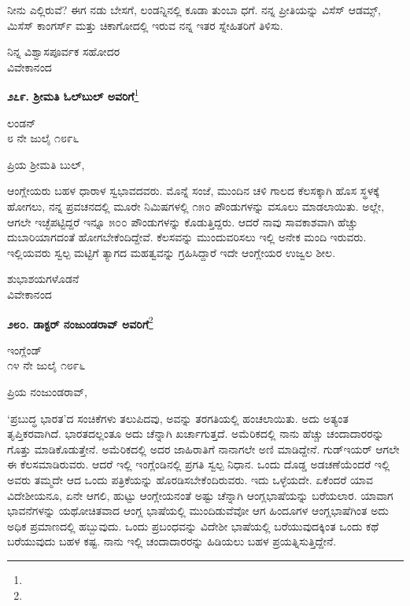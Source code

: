 ನೀನು ಎಲ್ಲಿರುವೆ? ಈಗ ನಡು ಬೇಸಗೆ, ಲಂಡನ್ನಿನಲ್ಲಿ ಕೂಡಾ ತುಂಬಾ ಧಗೆ. ನನ್ನ ಪ್ರೀತಿಯನ್ನು ವಿಸೆಸ್ ಆಡಮ್ಸ್, ಮಿಸೆಸ್ ಕಾಂಗರ್ಸ್ ಮತ್ತು ಚಿಕಾಗೋದಲ್ಲಿ ಇರುವ ನನ್ನ ಇತರ ಸ್ನೇಹಿತರಿಗೆ ತಿಳಿಸು.

\vspace{-0.5cm}

{\flushright
ನಿನ್ನ ವಿಶ್ವಾಸಪೂರ್ವಕ ಸಹೋದರ\\ವಿವೇಕಾನಂದ\par}

\begin{center}
\textbf{೨೭೯. ಶ‍್ರೀಮತಿ ಓಲ್‌ಬುಲ್‌ ಅವರಿಗೆ}\footnote{}
\end{center}

\vspace{-0.5cm}

\begin{flushright}
ಲಂಡನ್\\೮ ನೇ ಜುಲೈ ೧೮೯೬
\end{flushright}

\vspace{-0.5cm}

\noindent
ಪ್ರಿಯ ಶ‍್ರೀಮತಿ ಬುಲ್,

ಆಂಗ್ಲೇಯರು ಬಹಳ ಧಾರಾಳ ಸ್ವಭಾವದವರು. ಮೊನ್ನೆ ಸಂಜೆ, ಮುಂದಿನ ಚಳಿ ಗಾಲದ ಕೆಲಸಕ್ಕಾಗಿ ಹೊಸ ಸ್ಥಳಕ್ಕೆ ಹೋಗಲು, ನನ್ನ ಪ್ರವಚನದಲ್ಲಿ ಮೂರೇ ನಿಮಿಷಗಳಲ್ಲಿ ೧೫೦ ಪೌಂಡುಗಳನ್ನು ವಸೂಲು ಮಾಡಲಾಯಿತು. ಅಲ್ಲೇ, ಆಗಲೇ ಇಚ್ಛೆಪಟ್ಟಿದ್ದರೆ ಇನ್ನೂ ೫೦೦ ಪೌಂಡುಗಳನ್ನು ಕೊಡುತ್ತಿದ್ದರು. ಆದರೆ ನಾವು ಸಾವಕಾಶವಾಗಿ ಹೆಚ್ಚು ದುಬಾರಿಯಾಗದಂತೆ ಹೋಗಬೇಕೆಂದಿದ್ದೇವೆ. ಕೆಲಸವನ್ನು ಮುಂದುವರಿಸಲು ಇಲ್ಲಿ ಅನೇಕ ಮಂದಿ ಇರುವರು. ಇಲ್ಲಿಯವರು ಸ್ವಲ್ಪ ಮಟ್ಟಿಗೆ ತ್ಯಾಗದ ಮಹತ್ವವನ್ನು ಗ್ರಹಿಸಿದ್ದಾರೆ \enginline{-} ಇದೇ ಆಂಗ್ಲೇಯರ ಉಜ್ವಲ ಶೀಲ.

\vspace{-0.5cm}

{\flushright
ಶುಭಾಶಯಗಳೊಡನೆ\\ವಿವೇಕಾನಂದ\par}

\begin{center}
\textbf{೨೮೦. ಡಾಕ್ಟರ್ ನಂಜುಂಡರಾವ್ ಅವರಿಗೆ}\footnote{}
\end{center}

\begin{flushright}
ಇಂಗ್ಲೆಂಡ್\\೧೪ ನೇ ಜುಲೈ ೧೮೯೬
\end{flushright}

\noindent
ಪ್ರಿಯ ನಂಜುಂಡರಾವ್,

\vspace{0.1cm}

`ಪ್ರಬುದ್ಧ ಭಾರತ'ದ ಸಂಚಿಕೆಗಳು ತಲುಪಿದವು, ಅವನ್ನು ತರಗತಿಯಲ್ಲಿ ಹಂಚಲಾಯಿತು. ಅದು ಅತ್ಯಂತ ತೃಪ್ತಿಕರವಾಗಿದೆ. ಭಾರತದಲ್ಲಂತೂ ಅದು ಚೆನ್ನಾಗಿ ಖರ್ಚಾಗು\break ತ್ತದೆ. ಅಮೆರಿಕದಲ್ಲಿ ನಾನು ಹೆಚ್ಚು ಚಂದಾದಾರರನ್ನು ಗೊತ್ತು ಮಾಡಿಕೊಡುತ್ತೇನೆ. ಅಮೆರಿಕದಲ್ಲಿ ಅದರ ಜಾಹಿರಾತಿಗೆ ನಾನಾಗಲೇ ಅಣಿ ಮಾಡಿದ್ದೇನೆ. ಗುಡ್‌ಇಯರ್ ಆಗಲೇ ಈ ಕೆಲಸಮಾಡಿರುವರು. ಆದರೆ ಇಲ್ಲಿ ಇಂಗ್ಲೆಂಡಿನಲ್ಲಿ ಪ್ರಗತಿ ಸ್ವಲ್ಪ ನಿಧಾನ. ಒಂದು ದೊಡ್ಡ ಅಡಚಣೆಯೆಂದರೆ ಇಲ್ಲಿ ಅವರು ತಮ್ಮದೇ ಆದ ಒಂದು ಪತ್ರಿಕೆಯನ್ನು ಹೊರಡಿಸಬೇಕೆಂದಿರುವರು. ಇದು ಒಳ್ಳೆಯದೇ. ಏಕೆಂದರೆ ಯಾವ ವಿದೇಶೀಯನೂ, ಏನೇ ಆಗಲಿ, ಹುಟ್ಟು ಆಂಗ್ಲೇಯನಂತೆ ಅಷ್ಟು ಚೆನ್ನಾಗಿ ಆಂಗ್ಲಭಾಷೆಯನ್ನು ಬರೆಯಲಾರ. ಯಾವಾಗ ಭಾವನೆಗಳನ್ನು ಯಥೋಚಿತವಾದ ಆಂಗ್ಲ ಭಾಷೆಯಲ್ಲಿ ಮುಂದಿಡುವೆವೋ ಆಗ ಹಿಂದೂಗಳ ಆಂಗ್ಲಭಾಷೆಗಿಂತ ಅದು ಅಧಿಕ ಪ್ರಮಾಣದಲ್ಲಿ ಹಬ್ಬುವುದು. ಒಂದು ಪ್ರಬಂಧವನ್ನು ವಿದೇಶೀ ಭಾಷೆಯಲ್ಲಿ ಬರೆಯುವುದಕ್ಕಿಂತ ಒಂದು ಕಥೆ ಬರೆಯುವುದು ಬಹಳ ಕಷ್ಟ. ನಾನು ಇಲ್ಲಿ ಚಂದಾದಾರರನ್ನು ಹಿಡಿಯಲು ಬಹಳ ಪ್ರಯತ್ನಿಸುತ್ತಿದ್ದೇನೆ.

